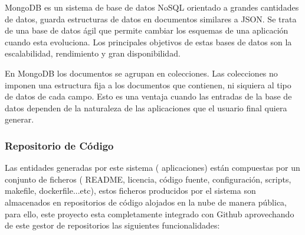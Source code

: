 \documentclass[a4paper,11pt]{book}
\begin{document}
MongoDB es un sistema de base de datos NoSQL orientado a grandes cantidades de datos, guarda estructuras de datos en documentos similares a JSON. Se trata de una base de datos ágil que permite cambiar los esquemas de una aplicación cuando esta evoluciona. Los principales objetivos de estas bases de datos son la escalabilidad, rendimiento y gran disponibilidad.

En MongoDB los documentos se agrupan en colecciones. Las colecciones  no imponen una estructura fija a los documentos que contienen, ni siquiera al tipo de datos de cada campo. Esto es una ventaja cuando las entradas de la base de datos dependen de la naturaleza de las aplicaciones que el usuario final quiera generar.


\subsubsection{Repositorio de Código}\label{repo}

Las entidades generadas por este sistema ( aplicaciones) están compuestas por un conjunto de ficheros ( README, licencia, código fuente, configuración, scripts, makefile, dockerfile...etc), estos ficheros producidos por el sistema son almacenados en repositorios de código alojados en la nube de manera pública, para ello, este proyecto esta completamente integrado con Github\cite{github} aprovechando de este gestor de repositorios las siguientes funcionalidades: 
\end{document}
